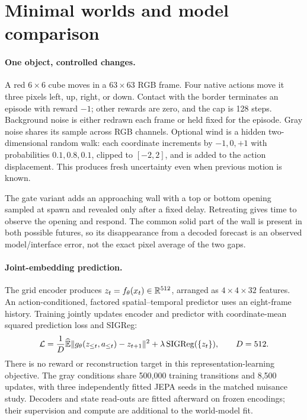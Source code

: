\section{Minimal worlds and model comparison}
\label{sec:worlds}

\paragraph{One object, controlled changes.}
A red $6\times6$ cube moves in a $63\times63$ RGB frame. Four native actions move it three pixels
left, up, right, or down. Contact with the border terminates an episode with reward $-1$; other
rewards are zero, and the cap is 128 steps. Background noise is either redrawn each frame or held
fixed for the episode. Gray noise shares its sample across RGB channels. Optional wind is a hidden
two-dimensional random walk: each coordinate increments by $-1,0,+1$ with probabilities
$0.1,0.8,0.1$, clipped to $[-2,2]$, and is added to the action displacement. This produces fresh
uncertainty even when previous motion is known.

The gate variant adds an approaching wall with a top or bottom opening sampled at spawn and
revealed only after a fixed delay. Retreating gives time to observe the opening and respond.
The common solid part of the wall is present in both possible futures, so its disappearance from
a decoded forecast is an observed model/interface error, not the exact pixel average of the two gaps.

\paragraph{Joint-embedding prediction.}
The grid encoder produces $z_t=f_\theta(x_t)\in\mathbb{R}^{512}$, arranged as $4\times4\times32$ features.
An action-conditioned, factored spatial--temporal predictor uses an eight-frame history. Training
jointly updates encoder and predictor with coordinate-mean squared prediction loss and SIGReg:
\begin{equation}
\label{eq:lewm}
\mathcal{L}=\frac1D\widehat{\mathbb{E}}\|g_\theta(z_{\le t},a_{\le t})-z_{t+1}\|^2
+\lambda\,\mathrm{SIGReg}(\{z_t\}),\qquad D=512.
\end{equation}
There is no reward or reconstruction target in this representation-learning objective. The gray
conditions share 500,000 training transitions and 8,500 updates, with three independently fitted
JEPA seeds in the matched nuisance study. Decoders and state read-outs are fitted afterward on
frozen encodings; their supervision and compute are additional to the world-model fit.

